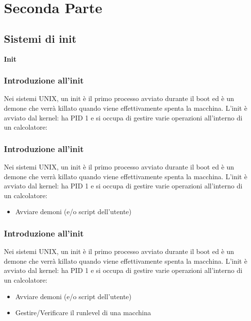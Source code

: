 \documentclass{beamer}
\begin{document}
\section{Seconda Parte}
\subsection{Sistemi di init}

\begin{frame}
\begin{center}
		\huge \textbf{Init}
\end{center}


\end{frame}
\begin{frame}
\frametitle{Introduzione all'init}
Nei sistemi UNIX, un init \`e il primo processo avviato durante il boot ed \`e un demone che verr\`a killato quando viene effettivamente spenta la macchina. L'init \`e avviato dal kernel: ha PID 1 e si occupa di gestire varie operazioni all'interno di un calcolatore:
\end{frame}


\begin{frame}
	\frametitle{Introduzione all'init}
	Nei sistemi UNIX, un init \`e il primo processo avviato durante il boot ed \`e un demone che verr\`a killato quando viene effettivamente spenta la macchina. L'init \`e avviato dal kernel: ha PID 1 e si occupa di gestire varie operazioni all'interno di un calcolatore:
 	\begin{itemize}
		\item Avviare demoni (e/o script dell'utente)
	\end{itemize}
\end{frame}


\begin{frame}
	\frametitle{Introduzione all'init}
	Nei sistemi UNIX, un init \`e il primo processo avviato durante il boot ed \`e un demone che verr\`a killato quando viene effettivamente spenta la macchina. L'init \`e avviato dal kernel: ha PID 1 e si occupa di gestire varie operazioni all'interno di un calcolatore:
	\begin{itemize}
		\item Avviare demoni (e/o script dell'utente)
		\item Gestire/Verificare il runlevel di una macchina
	\end{itemize}
\end{frame}
\end{document}
